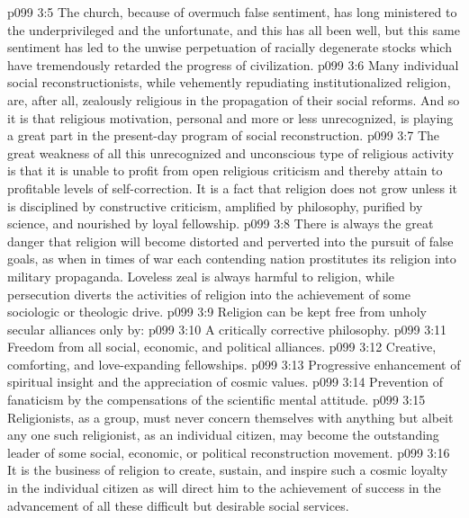 \vs p099 3:5 The church, because of overmuch false sentiment, has long ministered to the underprivileged and the unfortunate, and this has all been well, but this same sentiment has led to the unwise perpetuation of racially degenerate stocks which have tremendously retarded the progress of civilization.
\vs p099 3:6 Many individual social reconstructionists, while ve\-he\-ment\-ly repudiating institutionalized religion, are, after all, zealously religious in the propagation of their social reforms. And so it is that religious motivation, personal and more or less unrecognized, is playing a great part in the present\hyp{}day program of social reconstruction.
\vs p099 3:7 \pc The great weakness of all this unrecognized and unconscious type of religious activity is that it is unable to profit from open religious criticism and thereby attain to profitable levels of self\hyp{}correction. It is a fact that religion does not grow unless it is disciplined by constructive criticism, amplified by philosophy, purified by science, and nourished by loyal fellowship.
\vs p099 3:8 There is always the great danger that religion will become distorted and perverted into the pursuit of false goals, as when in times of war each contending nation prostitutes its religion into military propaganda. Loveless zeal is always harmful to religion, while persecution diverts the activities of religion into the achievement of some sociologic or theologic drive.
\vs p099 3:9 \pc Religion can be kept free from unholy secular alliances only by:
\vs p099 3:10 \bibnobreakspace A critically corrective philosophy.
\vs p099 3:11 \bibnobreakspace Freedom from all social, economic, and political alliances.
\vs p099 3:12 \bibnobreakspace Creative, comforting, and love\hyp{}expanding fellowships.
\vs p099 3:13 \bibnobreakspace Progressive enhancement of spiritual insight and the appreciation of cosmic values.
\vs p099 3:14 \bibnobreakspace Prevention of fanaticism by the compensations of the scientific mental attitude.
\vs p099 3:15 \pc Religionists, as a group, must never concern themselves with anything but  albeit any one such religionist, as an individual citizen, may become the outstanding leader of some social, economic, or political reconstruction movement.
\vs p099 3:16 It is the business of religion to create, sustain, and inspire such a cosmic loyalty in the individual citizen as will direct him to the achievement of success in the advancement of all these difficult but desirable social services.
